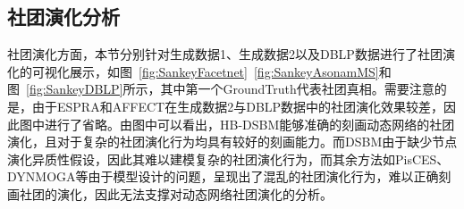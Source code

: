 \subsection{社团演化分析}


社团演化方面，本节分别针对生成数据1、生成数据2以及DBLP数据进行了社团演化的可视化展示，如图~\ref{fig:SankeyFacetnet}~\ref{fig:SankeyAsonamMS}和图~\ref{fig:SankeyDBLP}所示，其中第一个GroundTruth代表社团真相。需要注意的是，由于ESPRA和AFFECT在生成数据2与DBLP数据中的社团演化效果较差，因此图中进行了省略。由图中可以看出，HB-DSBM能够准确的刻画动态网络的社团演化，且对于复杂的社团演化行为均具有较好的刻画能力。而DSBM由于缺少节点演化异质性假设，因此其难以建模复杂的社团演化行为，而其余方法如PisCES、DYNMOGA等由于模型设计的问题，呈现出了混乱的社团演化行为，难以正确刻画社团的演化，因此无法支撑对动态网络社团演化的分析。



